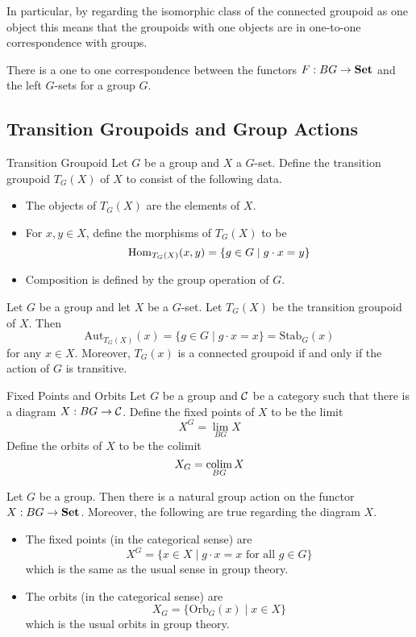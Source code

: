 \documentclass[a4paper]{article}
\begin{document}
In particular, by regarding the isomorphic class of the connected groupoid as one object this means that the groupoids with one objects are in one-to-one correspondence with groups. 

\begin{thm}{}{} There is a one to one correspondence between the functors $F:BG\to\bold{Set}$ and the left $G$-sets for a group $G$. 
\end{thm}

\subsection{Transition Groupoids and Group Actions}
\begin{defn}{Transition Groupoid}{} Let $G$ be a group and $X$ a $G$-set. Define the transition groupoid $T_G(X)$ of $X$ to consist of the following data. 
\begin{itemize}
\item The objects of $T_G(X)$ are the elements of $X$. 
\item For $x,y\in X$, define the morphisms of $T_G(X)$ to be $$\operatorname{Hom}_{T_G(X)}(x,y)=\{g\in G\;|\;g\cdot x=y\}$$
\item Composition is defined by the group operation of $G$. 
\end{itemize}
\end{defn}

\begin{lmm}{}{} Let $G$ be a group and let $X$ be a $G$-set. Let $T_G(X)$ be the transition groupoid of $X$. Then $$\text{Aut}_{T_G(X)}(x)=\{g\in G\;|\;g\cdot x=x\}=\text{Stab}_G(x)$$ for any $x\in X$. Moreover, $T_G(x)$ is a connected groupoid if and only if the action of $G$ is transitive. 
\end{lmm}

\begin{defn}{Fixed Points and Orbits}{} Let $G$ be a group and $\mathcal{C}$ be a category such that there is a diagram $X:BG\to\mathcal{C}$. Define the fixed points of $X$ to be the limit $$X^G=\lim_{BG}X$$ Define the orbits of $X$ to be the colimit $$X_G=\operatorname*{colim}_{BG}X$$
\end{defn}

\begin{thm}{}{} Let $G$ be a group. Then there is a natural group action on the functor $X:BG\to\bold{Set}$. Moreover, the following are true regarding the diagram $X$. 
\begin{itemize}
\item The fixed points (in the categorical sense) are $$X^G=\{x\in X\;|\;g\cdot x=x\text{ for all }g\in G\}$$ which is the same as the usual sense in group theory. 
\item The orbits (in the categorical sense) are $$X_G=\{\text{Orb}_G(x)\;|\;x\in X\}$$ which is the usual orbits in group theory. 
\end{itemize}
\end{thm}
\end{document}
